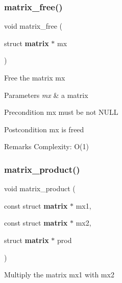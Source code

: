 \subsubsection{matrix\+\_\+free()}
{\footnotesize\ttfamily void matrix\+\_\+free (\begin{DoxyParamCaption}\item[{struct \textbf{ matrix} $\ast$}]{mx }\end{DoxyParamCaption})\hspace{0.3cm}{\ttfamily [inline]}}

Free the matrix {\ttfamily mx}


\begin{DoxyParams}{Parameters}
{\em mx} & a matrix\\
\hline
\end{DoxyParams}
\begin{DoxyPrecond}{Precondition}
{\ttfamily mx} must be not N\+U\+LL
\end{DoxyPrecond}
\begin{DoxyPostcond}{Postcondition}
{\ttfamily mx} is freed
\end{DoxyPostcond}
\begin{DoxyRemark}{Remarks}
Complexity\+: O(1) 
\end{DoxyRemark}
\mbox{\label{matrix_8c_a48e828fb00afc50e3616adefe87643bf}} 
\subsubsection{matrix\+\_\+product()}
{\footnotesize\ttfamily void matrix\+\_\+product (\begin{DoxyParamCaption}\item[{const struct \textbf{ matrix} $\ast$}]{mx1,  }\item[{const struct \textbf{ matrix} $\ast$}]{mx2,  }\item[{struct \textbf{ matrix} $\ast$}]{prod }\end{DoxyParamCaption})}

Multiply the matrix {\ttfamily mx1} with {\ttfamily mx2}


